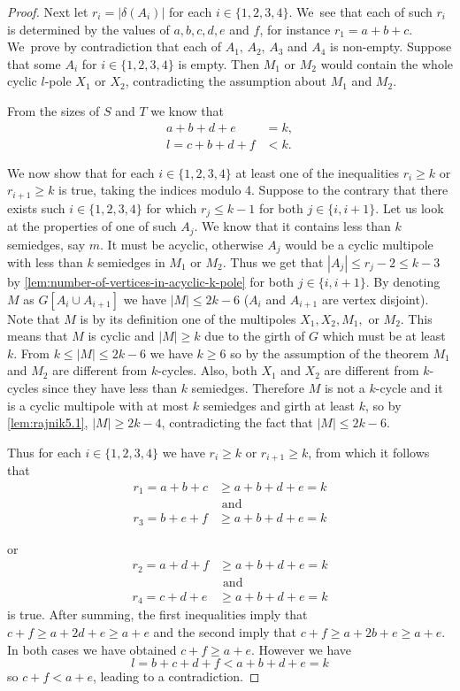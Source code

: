 \documentclass[12pt, twoside]{book}
\begin{document}
\begin{proof}
	Next let $r_i=|\delta(A_i)|$ for each $i\in\{1,2,3,4\}$. We~see that each of such $r_i$ is determined by the values of $a,b,c,d,e$ and $f$, for instance $r_1=a+b+c$. We~prove by contradiction that each of $A_1, \,A_2,\,A_3$ and $A_4$ is non-empty. Suppose that some $A_i$ for $i\in\{1,2,3,4\}$ is empty. Then $M_1$ or $M_2$ would contain the whole cyclic $l$-pole $X_1$ or $X_2$, contradicting the assumption about $M_1$ and $M_2$.
	
	From the sizes of $S$ and $T$ we know that
	\begin{align*}
		a+b+d+e &= k,\\
		l=c+b+d+f &< k.
	\end{align*}
	
	We now show that for each $i\in\{1,2,3,4\}$ at least one of the inequalities $r_i\geq k$ or $r_{i+1}\geq k$ is true, taking the indices modulo 4. Suppose to the contrary that there exists such $i\in\{1,2,3,4\}$ for which $r_j\leq k-1$ for both $j\in\{i, i+1\}$. Let us look at the properties of one of such $A_j$. We know that it contains less than $k$ semiedges, say $m$. It must be acyclic, otherwise $A_j$ would be a cyclic multipole with less than $k$ semiedges in $M_1$ or $M_2$. Thus we get that $|A_j|\leq r_j-2\leq k-3$ by \cref{lem:number-of-vertices-in-acyclic-k-pole} for both $j\in \{i, i+1\}$. By denoting $M$ as $G[A_i\cup A_{i+1}]$ we have $|M|\leq 2k-6$ ($A_i$ and $A_{i+1}$ are vertex disjoint). Note that $M$ is by its definition one of the multipoles $X_1, X_2, M_1,$ or $M_2$. This means that $M$ is cyclic and $|M|\geq k$ due to the girth of $G$ which must be at least $k$. From $k\leq |M|\leq 2k-6$ we have $k\geq 6$ so by the assumption of the theorem $M_1$ and $M_2$ are different from $k$-cycles. Also, both $X_1$ and $X_2$ are different from $k$-cycles since they have less than $k$ semiedges. Therefore $M$ is not a $k$-cycle and it is a cyclic multipole with at most $k$ semiedges and girth at least $k$, so by \cref{lem:rajnik5.1}, $|M| \geq 2k - 4$, contradicting the fact that $|M|\leq 2k-6$.
	
	Thus for each $i\in\{1,2,3,4\}$ we have $r_i\geq k$ or $r_{i+1}\geq k$, from which it follows that
	\begin{align*}
		r_1 =a+b+c&\geq a+b+d+e=k \\
		&\text{ and }\\
		r_3 =b+e+f &\geq a+b+d+e=k
	\end{align*}
	
	or
	\begin{align*}
		r_2 =a+d+f &\geq a+b+d+e=k \\
		&\text{ and }\\
		r_4 =c+d+e&\geq a+b+d+e=k
	\end{align*}
	is true. After summing, the first inequalities imply that $c+f\geq a+2d+e\geq a+e$ and the second imply that $c+f\geq a+2b+e\geq a+e$. In both cases we have obtained $c+f\geq a+e$. However we have 
	$$l=b+c+d+f<a+b+d+e=k$$
	so $c+f<a+e$, leading to a contradiction.
	

\end{proof}
\end{document}
